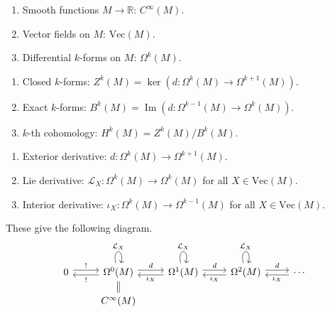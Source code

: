 \documentclass[b5paper,final]{article}
\renewcommand{\im}{\operatorname{Im}}
\newcommand{\smth}{C^\infty}
\newcommand{\df}{\Omega}
\newcommand{\vf}{\mathrm{Vec}}
\newcommand{\lied}[1]{\mathcal{L}_{#1}}
\newcommand{\intd}[1]{\iota_{#1}}
\begin{document}
\begin{notation}{} \strut
    \begin{enumerate}
        \item Smooth functions $M \to \mathbb{R}$: $\smth(M)$.
        \item Vector fields on $M$: $\vf(M)$.
        \item Differential $k$-forms on $M$: $\df^k(M)$.
    \end{enumerate}
\end{notation}

\begin{definition}{} \strut
    \begin{enumerate}
        \item Closed $k$-forms: $Z^k(M) = \ker(d : \df^k(M) \to \df^{k+1}(M))$.
        \item Exact $k$-forms: $B^k(M) = \im(d : \df^{k-1}(M) \to \df^k(M))$.
        \item $k$-th cohomology: $H^k(M) = Z^k(M)/B^k(M)$.
    \end{enumerate}
\end{definition}

\begin{notation}{} \strut
    \begin{enumerate}
        \item Exterior derivative: $d : \df^k(M) \to \df^{k+1}(M)$.
        \item Lie derivative: $\lied{X} : \df^k(M) \to \df^k(M)$ for all $X \in \vf(M)$.
        \item Interior derivative: $\intd{X} : \df^k(M) \to \df^{k-1}(M)$ for all $X \in \vf(M)$.
    \end{enumerate}
    \begin{remark}
    These give the following diagram.
        \begin{equation*}
            \begin{tikzcd}
                0 \arrow[r, shift left, "!"] & \df^0(M) \arrow[loop above, "\lied{X}"] \arrow[r, shift left, "d"] \arrow[l, shift left, "!"] & \df^1(M) \arrow[loop above, "\lied{X}"] \arrow[r, shift left, "d"] \arrow[l, shift left, "\intd{X}"] & \df^2(M) \arrow[loop above, "\lied{X}"] \arrow[r, shift left, "d"] \arrow[l, shift left, "\intd{X}"] & \cdots \arrow[l, shift left, "\intd{X}"] \\[-1.5ex]
                & \smth(M) \arrow[u, equal]
            \end{tikzcd}
        \end{equation*}
\end{remark}
\end{notation}
\end{document}
